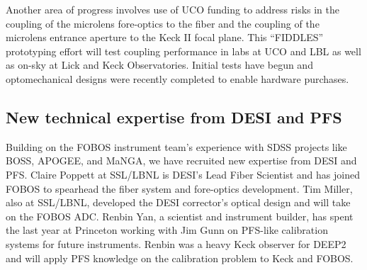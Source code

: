

Another area of progress involves use of UCO funding to address risks in the
coupling of the microlens fore-optics to the fiber and the coupling
of the microlens entrance aperture to the Keck II focal plane.  This ``FIDDLES'' prototyping effort will test coupling performance in labs at UCO and LBL as well as on-sky at Lick and Keck Observatories.  Initial tests have begun and optomechanical designs were recently completed to enable hardware purchases.


\subsection{New technical expertise from DESI and PFS} Building on the FOBOS instrument team's experience with SDSS projects like BOSS, APOGEE, and MaNGA, we have recruited new expertise from DESI and PFS.  Claire Poppett at SSL/LBNL is DESI's Lead Fiber Scientist and has joined FOBOS to spearhead the fiber system and fore-optics development.  Tim Miller, also at SSL/LBNL, developed the DESI corrector's optical design and will take on the FOBOS ADC.  Renbin Yan, a scientist and instrument builder, has spent the last year at Princeton working with Jim Gunn on PFS-like calibration systems for future instruments.  Renbin was a heavy Keck observer for DEEP2 and will apply PFS knowledge on the calibration problem to Keck and FOBOS.

